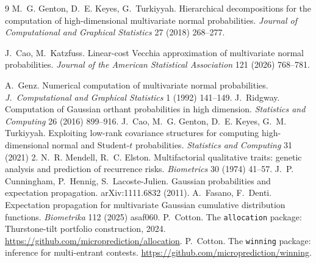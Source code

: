 \documentclass[12pt]{article}
\theoremstyle{remark}
\begin{document}
\begin{thebibliography}{9}
M.~G. Genton, D.~E. Keyes, G.~Turkiyyah. Hierarchical decompositions for
the computation of high-dimensional multivariate normal probabilities.
\emph{Journal of Computational and Graphical Statistics} 27 (2018)
268--277.

 J.~Cao, M.~Katzfuss.
Linear-cost Vecchia approximation of multivariate normal probabilities.
\emph{Journal of the American Statistical Association} 121 (2026)
768--781.

 A.~Genz. Numerical computation of multivariate normal
probabilities. \emph{J.\ Computational and Graphical Statistics} 1 (1992)
141--149.
 J.~Ridgway. Computation of Gaussian orthant
probabilities in high dimension. \emph{Statistics and Computing} 26 (2016)
899--916.
 J.~Cao, M.~G. Genton, D.~E. Keyes, G.~M. Turkiyyah.
Exploiting low-rank covariance structures for computing high-dimensional
normal and Student-$t$ probabilities. \emph{Statistics and Computing} 31
(2021) 2.
 N.~R. Mendell, R.~C. Elston. Multifactorial
qualitative traits: genetic analysis and prediction of recurrence risks.
\emph{Biometrics} 30 (1974) 41--57.
 J.~P. Cunningham, P.~Hennig, S.~Lacoste-Julien.
Gaussian probabilities and expectation propagation. arXiv:1111.6832 (2011).
 A.~Fasano, F.~Denti. Expectation propagation for
multivariate Gaussian cumulative distribution functions.
\emph{Biometrika} 112 (2025) asaf060.
 P.~Cotton. The
\texttt{allocation} package: Thurstone-tilt portfolio construction,
2024. \url{https://github.com/microprediction/allocation}.
 P.~Cotton. The \texttt{winning} package: inference for multi-entrant contests. \url{https://github.com/microprediction/winning}.

\end{thebibliography}
\end{document}
